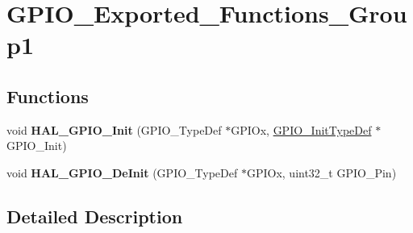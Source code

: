 \hypertarget{group___g_p_i_o___exported___functions___group1}{}\section{G\+P\+I\+O\+\_\+\+Exported\+\_\+\+Functions\+\_\+\+Group1}
\label{group___g_p_i_o___exported___functions___group1}
\subsection*{Functions}
\begin{DoxyCompactItemize}
\item 
\mbox{\label{group___g_p_i_o___exported___functions___group1_ga41bda93b6dd639e4905fdb1454eff98e}} 
void {\bfseries H\+A\+L\+\_\+\+G\+P\+I\+O\+\_\+\+Init} (G\+P\+I\+O\+\_\+\+Type\+Def $\ast$G\+P\+I\+Ox, \hyperlink{struct_g_p_i_o___init_type_def}{G\+P\+I\+O\+\_\+\+Init\+Type\+Def} $\ast$G\+P\+I\+O\+\_\+\+Init)
\item 
\mbox{\label{group___g_p_i_o___exported___functions___group1_gafe9c756b5aa18961032a3f8aa572959b}} 
void {\bfseries H\+A\+L\+\_\+\+G\+P\+I\+O\+\_\+\+De\+Init} (G\+P\+I\+O\+\_\+\+Type\+Def $\ast$G\+P\+I\+Ox, uint32\+\_\+t G\+P\+I\+O\+\_\+\+Pin)
\end{DoxyCompactItemize}


\subsection{Detailed Description}
